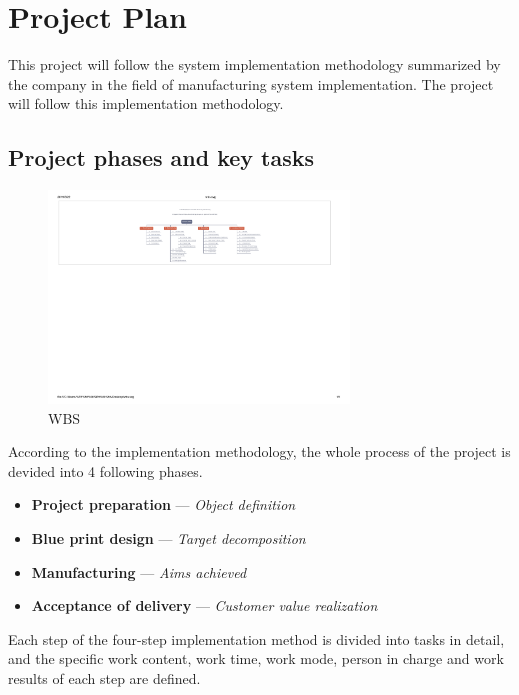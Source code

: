 \chapter{Project Plan}

This project will follow the system implementation methodology summarized by the company in the field of manufacturing system implementation. The project will follow this implementation methodology.

\section{Project phases and key tasks}

{\color{red}{WBS分解}}

\begin{figure}[!htb]
\centering
\includegraphics[width=8cm]{pic/wbs.pdf}
\caption{WBS}
\label{fig:wbs}
\end{figure}

According to the implementation methodology, the whole process of the project is devided into 4 following phases.

\begin{itemize}
	\item \textbf{Project preparation} --- \textit{Object definition}

	\item \textbf{Blue print design} --- \textit{Target decomposition}

	\item \textbf{Manufacturing} --- \textit{Aims achieved}

	\item \textbf{Acceptance of delivery} --- \textit{Customer value realization}
\end{itemize}

Each step of the four-step implementation method is divided into tasks in detail, and the specific work content, work time, work mode, person in charge and work results of each step are defined.

